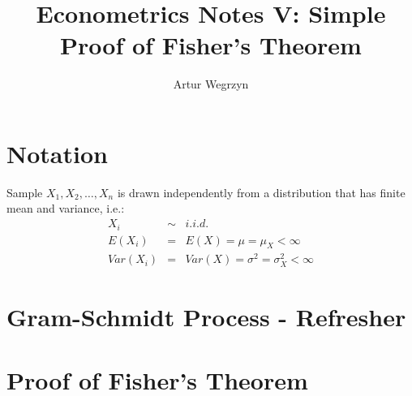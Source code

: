 \documentclass[12pt]{article}
\begin{document}
\title{Econometrics Notes V: Simple Proof of Fisher's Theorem}
\author{Artur Wegrzyn}
\maketitle


\tableofcontents

\section{Notation}
Sample $X_1, X_2, \dots, X_n$ is drawn independently from a distribution that
has finite mean and variance, i.e.:
\begin{eqnarray*}
X_i &\sim & i.i.d. \\
E(X_i) &=& E(X) = \mu = \mu_X < \infty \\
Var(X_i) &=& Var(X) = \sigma^2 = \sigma^2_X < \infty
\end{eqnarray*}

\section{Gram-Schmidt Process - Refresher}

\section{Proof of Fisher's Theorem}
\end{document}
